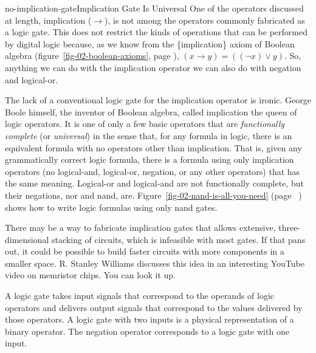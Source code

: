 \begin{aside}{no-implication-gate}{Implication Gate Is Universal}
One of the operators discussed at length, implication
($\rightarrow$), is not among the operators commonly fabricated
as a logic gate. This does not restrict the kinds of
operations that can be performed by digital logic because,
as we know from the \{implication\} axiom of Boolean algebra
(figure~\ref{fig-02-boolean-axioms}, page \pageref{fig-02-boolean-axioms}),
$(x \rightarrow y) = ((\neg x) \vee y)$.
So, anything we can do with
the implication operator we can also do with
negation and logical-or.

The lack of a conventional logic gate for the implication operator
is ironic.
George Boole himself, the inventor of Boolean algebra,
called implication the queen of logic operators.
It is one of only a few basic operators that are
\emph{functionally complete} (or \emph{universal})
in the sense that, for any formula in logic, there is an equivalent formula
with no operators other than implication.
That is, given any grammatically correct logic formula,
there is a formula using only
implication operators (no logical-and, logical-or,
negation, or any other operators)
that has the same meaning.
Logical-or and logical-and are not functionally complete,
but their negations,
nor and nand, are.
Figure~\ref{fig-02-nand-is-all-you-need} (page ~\pageref{fig-02-nand-is-all-you-need})
shows how to write logic formulas using only nand gates.

There may be a way
to fabricate implication gates that allows extensive,
three-dimensional stacking of circuits, which is infeasible with
most gates.
If that pans out, it could be possible to build
faster circuits with more components in a smaller space.
R. Stanley Williams discusses this
idea in an interesting YouTube video on memristor chips.
You can look it up.
\end{aside}

A logic gate takes input signals that correspond
to the operands of logic operators and delivers output signals
that correspond to the values delivered by those operators.
A logic gate with two inputs is a physical representation of
a binary operator. The negation operator corresponds to a
logic gate with one input.

